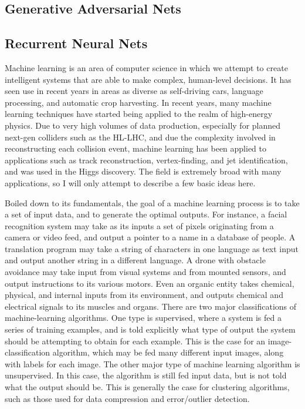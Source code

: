 \subsection{Generative Adversarial Nets}

\subsection{Recurrent Neural Nets}\label{sec:RNN}


Machine learning is an area of computer science in which we attempt to create intelligent systems that are able to make complex, human-level decisions. It has seen use in recent years in areas as diverse as self-driving cars, language processing, and automatic crop harvesting. In recent years, many machine learning techniques have started being applied to the realm of high-energy physics. Due to very high volumes of data production, especially for planned next-gen colliders such as the HL-LHC, and due the complexity involved in reconstructing each collision event, machine learning has been applied to applications such as track reconstruction, vertex-finding, and jet identification, and was used in the Higgs discovery. The field is extremely broad with many applications, so I will only attempt to describe a few basic ideas here.

Boiled down to its fundamentals, the goal of a machine learning process is  to take a set of input data, and to generate the optimal outputs. For instance, a facial recognition system may take as its inputs a set of pixels originating from a camera or video feed, and output a pointer to a name in a database of people. A translation program may take a string of characters in one language as text input and output another string in a different language. A drone with obstacle avoidance may take input from visual systems and from mounted sensors, and output instructions to its various motors. Even an organic entity takes chemical, physical, and internal inputs from its environment, and outputs chemical and electrical signals to its muscles and organs. There are two major classifications of machine-learning algorithms. One type is supervised, where a system is fed a series of training examples, and is told explicitly what type of output the system should be attempting to obtain for each example. This is the case for an image-classification algorithm, which may be fed many different input images, along with labels for each image. The other major type of machine learning algorithm is unsupervised. In this case, the algorithm is still fed input data, but is not told what the output should be. This is generally the case for clustering algorithms, such as those used for data compression and error/outlier detection.

